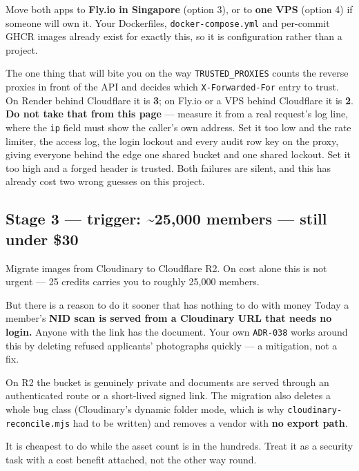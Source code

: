 \documentclass[11pt,a4paper]{article}
\begin{document}
Move both apps to \textbf{Fly.io in Singapore} (option 3), or to \textbf{one VPS} (option 4) if someone will own it. Your Dockerfiles, \texttt{docker-compose.yml} and per-commit GHCR images already exist for exactly this, so it is configuration rather than a project.

\begin{warnbox}{The one thing that will bite you on the way}
\texttt{TRUSTED\_PROXIES} counts the reverse proxies in front of the API and decides which \texttt{X-Forwarded-For} entry to trust. On Render behind Cloudflare it is \textbf{3}; on Fly.io or a VPS behind Cloudflare it is \textbf{2}. \textbf{Do not take that from this page} --- measure it from a real request's log line, where the \texttt{ip} field must show the caller's own address. Set it too low and the rate limiter, the access log, the login lockout and every audit row key on the proxy, giving everyone behind the edge one shared bucket and one shared lockout. Set it too high and a forged header is trusted. Both failures are silent, and this has already cost two wrong guesses on this project.
\end{warnbox}

\subsection{Stage 3 --- trigger: \textasciitilde25{,}000 members --- still under \$30}

Migrate images from Cloudinary to Cloudflare R2. On cost alone this is not urgent --- 25 credits carries you to roughly 25{,}000 members.

\begin{notebox}{But there is a reason to do it sooner that has nothing to do with money}
Today a member's \textbf{NID scan is served from a Cloudinary URL that needs no login.} Anyone with the link has the document. Your own \texttt{ADR-038} works around this by deleting refused applicants' photographs quickly --- a mitigation, not a fix.

On R2 the bucket is genuinely private and documents are served through an authenticated route or a short-lived signed link. The migration also deletes a whole bug class (Cloudinary's dynamic folder mode, which is why \texttt{cloudinary-reconcile.mjs} had to be written) and removes a vendor with \textbf{no export path}.

It is cheapest to do while the asset count is in the hundreds. Treat it as a security task with a cost benefit attached, not the other way round.
\end{notebox}
\end{document}
